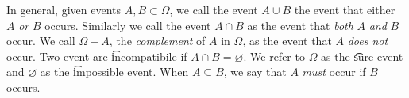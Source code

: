 In general, given events $A, B \subset \Omega $, we call the event $A \cup B$ the event that either $A$ \textit{or} $B$ occurs.
Similarly we call the event $A \cap  B$ as the event that \textit{both} $A$ \textit{and} $B$ occur.
We call $\Omega  - A$, the \textit{complement} of $A$ in $\Omega $, as the event that $A$ \textit{does not} occur.
Two event are \t{incompatibile} if $A \cap  B = \varnothing$.
We refer to $\Omega $ as the \t{sure event} and $\varnothing$ as the \t{impossible event}.
When $A \subseteq B$, we say that $A$ \textit{must} occur if $B$ occurs.

\blankpage